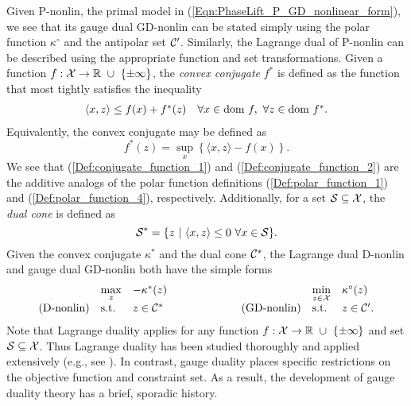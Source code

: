 Given P-nonlin, the primal model in (\ref{Eqn:PhaseLift_P_GD_nonlinear_form}), we see that its gauge dual GD-nonlin can be stated simply using the polar function $\kappa^\circ$ and the antipolar set ${\mathcal C}'$.  
Similarly, the Lagrange dual of P-nonlin can be described using the appropriate function and set transformations.  Given a function $f : {\mathcal X} \rightarrow {\mathbb R} \ \cup \ \{\pm \infty\}$, the \textit{convex conjugate} $f^*$ is defined as the function that most tightly satisfies the inequality
\begin{equation} 			\label{Def:conjugate_function_1}
\begin{array}{ll}
	\langle x, z \rangle \leq f(x) + f^*(z)
			&	\forall x \in \textnormal{dom} \ f, \ \forall z \in \textnormal{dom} \ f^*.
\end{array}
\end{equation}
Equivalently, the convex conjugate may be defined as \cite[Section 12]{rockafellar1970convex}
\begin{equation} 			\label{Def:conjugate_function_2}
f^*(z) = \sup_x \left\{ \langle x, z \rangle - f(x)  \right\}.
\end{equation}
We see that (\ref{Def:conjugate_function_1}) and (\ref{Def:conjugate_function_2}) are the additive analogs of the polar function definitions (\ref{Def:polar_function_1}) and (\ref{Def:polar_function_4}), respectively.  Additionally, for a set ${\mathcal S} \subseteq {\mathcal X}$, the \textit{dual cone} is defined as
\begin{equation}			\label{Def:dual_cone}
{\mathcal S}^* = \{ z \ | \ \langle x, z \rangle \leq 0 \ \forall x \in {\mathcal S} \}.
\end{equation}
Given the convex conjugate $\kappa^*$ and the dual cone ${\mathcal C}^*$, the Lagrange dual D-nonlin and gauge dual GD-nonlin both have the simple forms
\begin{equation} 			
\begin{array}{lllllll}
	&	\max\limits_{\substack{z}}
		&	-\kappa^*(z)
			&
				&	\min\limits_{\substack{z \in {\mathcal X}}}
					&	\kappa^\circ(z)
						\\
\textnormal{(D-nonlin)}
	&	\textnormal{s.t.}
		&z \in {\mathcal C}^*
			&	\hspace{2cm} 	\textnormal{(GD-nonlin)}
				&	\textnormal{s.t.}
					&	z \in {\mathcal C}'.
\end{array}
\end{equation}
Note that Lagrange duality applies for any function $f : {\mathcal X} \rightarrow {\mathbb R} \ \cup \ \{\pm \infty\}$ and set ${\mathcal S} \subseteq {\mathcal X}$.  Thus Lagrange duality has been studied thoroughly and applied extensively (e.g., see \cite[Chapter 5]{boyd2004convex}).  In contrast, gauge duality places specific restrictions on the objective function and constraint set.  As a result,  the development of gauge duality theory has a brief, sporadic history.






